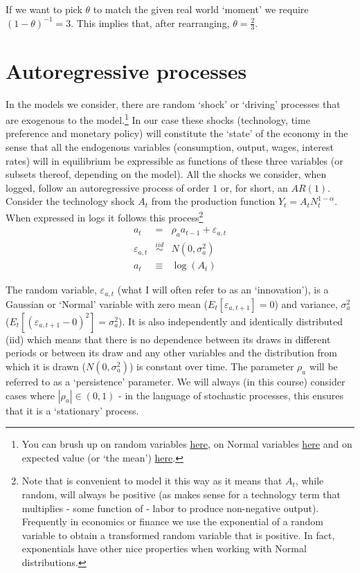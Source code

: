 \documentclass[authoryear,11pt]{elsarticle}
\begin{document}
If we want to pick $\theta$ to match the given real world `moment' we require $(1-\theta)^{-1} = 3$. This implies that, after rearranging, $\theta = \frac{2}{3}$.


\section{Autoregressive processes}
In the models we consider, there are random `shock' or `driving' processes that are exogenous to the model.\footnote{You can brush up on random variables \href{https://en.wikipedia.org/wiki/Random_variable}{here}, on Normal variables \href{https://en.wikipedia.org/wiki/Normal_distribution}{here} and on expected value (or `the mean') \href{https://en.wikipedia.org/wiki/Expected_value}{here}.} In our case these shocks (technology, time preference and monetary policy) will constitute the `state' of the economy in the sense that all the endogenous variables (consumption, output, wages, interest rates) will in equilibrium be expressible as functions of these three variables (or subsets thereof, depending on the model). All the shocks we consider, when logged, follow an autoregressive process of order $1$ or, for short, an $AR(1)$. Consider the technology shock $A_{t}$ from the production function $Y_{t} = A_{t}N_{t}^{1-\alpha}$. When expressed in logs it follows this process\footnote{Note that is convenient to model it this way as it means that $A_{t}$, while random, will always be positive (as makes sense for a technology term that multiplies - some function of - labor to produce non-negative output). Frequently in economics or finance we use the exponential of a random variable to obtain a transformed random variable that is positive. In fact, exponentials have other nice properties when working with Normal distributions.}
\begin{eqnarray}
a_{t} 			&=& \rho_{a} a_{t-1} + \varepsilon_{a,t} 	\label{eqn:ar1} \\
\varepsilon_{a,t} &\overset{iid}{\sim}& N(0,\sigma^{2}_{a})	\nonumber \\
a_{t}			&\equiv& \log{(A_{t})} \nonumber
\end{eqnarray}

The random variable, $\varepsilon_{a,t}$  (what I will often refer to as an `innovation'), is a Gaussian or `Normal' variable with zero mean ($E_{t}[\varepsilon_{a,t+1}] = 0$) and variance, $\sigma^{2}_{a}$ ($E_{t}[(\varepsilon_{a,t+1} - 0)^{2}] = \sigma^{2}_{a}$). It is also independently and identically distributed (iid) which means that there is no dependence between its draws in different periods or between its draw and any other variables and the distribution from which it is drawn ($N(0,\sigma^{2}_{a})$) is constant over time. The parameter $\rho_{a}$ will be referred to as a `persistence' parameter. We will always (in this course) consider cases where $|\rho_{a}| \in (0,1)$ - in the language of stochastic processes, this ensures that it is a `stationary' process.
\end{document}
